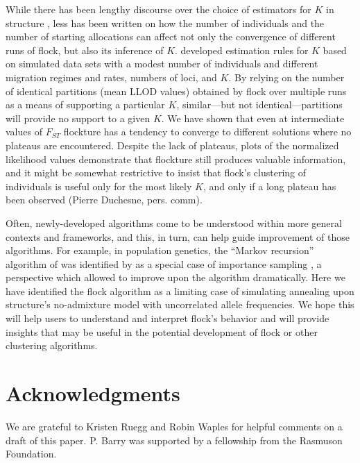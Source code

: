 While there has been lengthy 
discourse over the choice of estimators for $K$ in {\sc structure} 
\citep{Pritchardetal2000,Evannoetal2005,Wap&Gag2006,Gaoetal2011}, less has been written on how the number of 
individuals
and the number of starting allocations can affect not only the convergence of different runs of {\sc flock}, but also its 
inference of $K$. \citeauthor{Duc&Tur2012} developed estimation rules for $K$ based on simulated data 
sets with a modest number of individuals and different migration regimes and rates, numbers of loci, and $K$. 
By relying on the number of identical partitions (mean LLOD values) obtained by {\sc flock} over multiple
runs as a means of supporting 
a particular $K$,  similar---but not identical---partitions
will provide no support to a given $K$. We have shown that even at intermediate
values of $F_{ST}$ {\sc flockture} has a tendency to converge to 
different solutions where no plateaus are encountered. Despite the lack of
plateaus, plots of the normalized likelihood values demonstrate that
{\sc flockture} still produces valuable information, and it might be somewhat
restrictive to insist that {\sc flock}'s clustering of individuals is useful
only for the most likely $K$, and only if a long plateau has been
observed (Pierre Duchesne, pers. comm).  

 
Often, newly-developed algorithms come to be understood within more general contexts and 
frameworks, and this, in turn, can help guide improvement of those algorithms.  For example, in population
genetics, the ``Markov recursion'' algorithm of \citet{Gri&Tav1994-AI} was identified by \citet{Felsensteinetal1999} 
as a special case of importance sampling \citep{Ham&Han1964}, a perspective which allowed 
\citet{Ste&Don2000} to improve upon the algorithm dramatically.  Here we have identified the {\sc flock}
algorithm as a limiting case of simulating annealing upon {\sc structure}'s no-admixture model with uncorrelated
allele frequencies. We hope this will
help users to understand and interpret {\sc flock}'s behavior and will provide insights that may be useful 
in the potential development of {\sc flock} or other clustering algorithms.   


\section*{Acknowledgments}
We are grateful to Kristen Ruegg and Robin Waples for helpful comments on a draft of this paper.
P. Barry was supported by a fellowship from the Rasmuson Foundation.